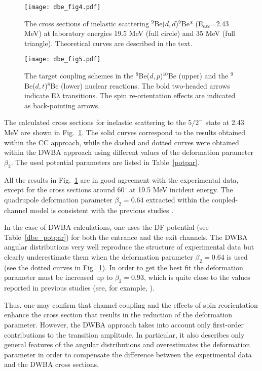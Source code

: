 \documentclass[
12pt, %
oneside, %
english, %
onehalfspacing, %
onehalfspacing, %
headsepline, %
]{MastersDoctoralThesis} %
\begin{document}
\begin{figure}[tp]
\centering
\texttt{[image: dbe\_fig4.pdf]}
\decoRule
\caption{\label{dbe_fig4} \footnotesize The cross sections of inelastic scattering ${}^9$Be($d,d$)$^9$Be* (E$_{exc}$=2.43 MeV) at laboratory energies 19.5 MeV (full circle) and 35 MeV (full triangle). Theoretical curves are described in the text.}
\end{figure} 


\begin{figure}[tp]
\centering
\texttt{[image: dbe\_fig5.pdf]}
\decoRule
\caption{ \label{dbe_fig5} \footnotesize The target coupling schemes in the ${}^9$Be($d,p$)$^{10}$Be (upper) and the ${}^9$Be($d,t$)$^8$Be (lower) nuclear reactions. The bold two-headed arrows indicate E$\lambda$ transitions. The spin re-orientation effects are indicated as back-pointing arrows.}
\end{figure} 

The calculated cross sections for inelastic scattering to the $5/2^-$ state at 2.43 MeV are shown in Fig.~\ref{dbe_fig4}. The solid curves correspond to the results obtained within the CC approach, while the dashed and dotted curves were obtained within the DWBA approach using  different values of the deformation parameter $\beta_2$. The used potential parameters are listed in Table~\ref{potpar}.


All the results in Fig.~\ref{dbe_fig4} are in good agreement with the experimental data, except for the cross sections around 60$^\circ$ at 19.5 MeV incident energy. The quadrupole deformation parameter $\beta_2 = 0.64$ extracted within the coupled-channel model is consistent with the previous studies \cite{lukyanov2014study, harakeh1980strong}.

In the case of DWBA calculations, one uses the DF potential (see Table~\ref{dbe_potpar}) for both the entrance and the exit channels. The DWBA angular distributions very well reproduce the structure of experimental data but clearly underestimate them when the deformation parameter $\beta_2 = 0.64$ is used (see the dotted curves in Fig.~\ref{dbe_fig4}). In order to get the best fit the deformation parameter must be increased up to $\beta_2 = 0.93$, which is quite close to the values reported in previous studies (see, for example, \cite{bodek1989, votava1973}).

Thus, one may confirm that channel coupling and the effects of spin reorientation enhance the cross section that results in the reduction of the deformation parameter. However, the DWBA approach takes into account only first-order contributions to the transition amplitude. In particular, it also describes only general features of the angular distributions and overestimates the deformation parameter in order to compensate the difference between the experimental data and the DWBA cross sections.
\end{document}
